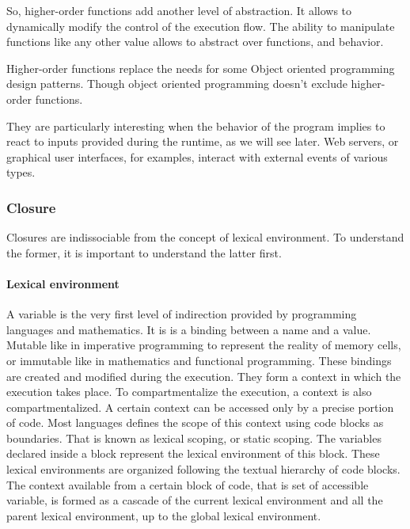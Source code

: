 So, higher-order functions add another level of abstraction.
It allows to dynamically modify the control of the execution flow.
The ability to manipulate functions like any other value allows to abstract over functions, and behavior.

Higher-order functions replace the needs for some Object oriented programming design patterns. Though object oriented programming doesn't exclude higher-order functions.

They are particularly interesting when the behavior of the program implies to react to inputs provided during the runtime, as we will see later.
Web servers, or graphical user interfaces, for examples, interact with external events of various types.


\subsubsection{Closure}


Closures are indissociable from the concept of lexical environment.
To understand the former, it is important to understand the latter first.

\paragraph{Lexical environment}

A variable is the very first level of indirection provided by programming languages and mathematics.
It is is a binding between a name and a value.
Mutable like in imperative programming to represent the reality of memory cells, or immutable like in mathematics and functional programming.
These bindings are created and modified during the execution.
They form a context in which the execution takes place.
To compartmentalize the execution, a context is also compartmentalized.
A certain context can be accessed only by a precise portion of code.
Most languages defines the scope of this context using code blocks as boundaries.
That is known as lexical scoping, or static scoping.
The variables declared inside a block represent the lexical environment of this block.
These lexical environments are organized following the textual hierarchy of code blocks.
The context available from a certain block of code, that is set of accessible variable, is formed as a cascade of the current lexical environment and all the parent lexical environment, up to the global lexical environment.

